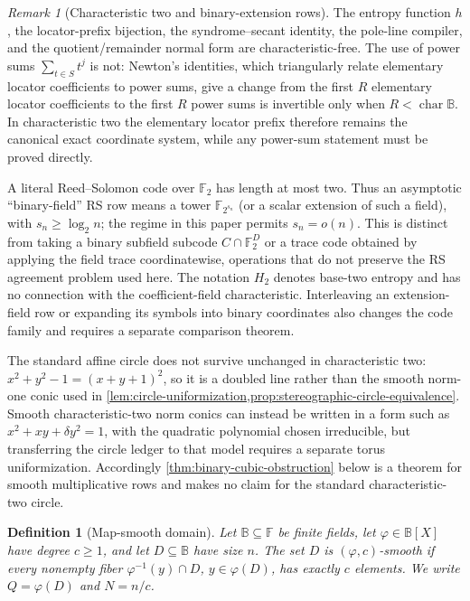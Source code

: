 \documentclass[12pt,a4paper]{amsart}
\numberwithin{equation}{section}
\newtheorem{definition}[definition]{Definition}
\theoremstyle{remark}
\newtheorem{remark}[remark]{Remark}
\newcommand{\F}{\mathbb F}
\newcommand{\B}{\mathbb B}
\begin{document}
\begin{remark}[Characteristic two and binary-extension rows]
\label{rem:characteristic-two-rows}
The entropy function \(h\), the locator-prefix bijection, the
syndrome--secant identity, the pole-line compiler, and the
quotient/remainder normal form are characteristic-free.  The use of
power sums \(\sum_{t\in S}t^j\) is not: Newton's identities, which triangularly relate elementary
locator coefficients to power sums, give a change from the first \(R\)
elementary locator coefficients to the first \(R\) power sums is
invertible only when \(R<\operatorname{char}\B\).  In characteristic two
the elementary locator prefix therefore remains the canonical exact
coordinate system, while any power-sum statement must be proved directly.

A literal Reed--Solomon code over \(\F_2\) has length at most two.  Thus an
asymptotic ``binary-field'' RS row means a tower
\(\F_{2^{s_n}}\) (or a scalar extension of such a field), with
\(s_n\ge\log_2 n\); the regime in this paper permits
\(s_n=o(n)\).  This is distinct from taking a binary subfield subcode
\(C\cap\F_2^D\) or a trace code obtained by applying the field trace
coordinatewise, operations that do not preserve the RS agreement problem
used here.  The notation \(H_2\) denotes base-two entropy and has no
connection with the coefficient-field characteristic.  Interleaving an
extension-field row or expanding its symbols into binary coordinates also
changes the code family and requires a separate comparison theorem.

The standard affine circle does not survive unchanged in characteristic
two: \(x^2+y^2-1=(x+y+1)^2\), so it is a doubled line rather than the
smooth norm-one conic used in
\cref{lem:circle-uniformization,prop:stereographic-circle-equivalence}.
Smooth characteristic-two norm
conics can instead be written in a form such as
\(x^2+xy+\delta y^2=1\), with the quadratic polynomial chosen
irreducible, but transferring the circle ledger to that model requires a
separate torus uniformization.  Accordingly
\cref{thm:binary-cubic-obstruction} below is a theorem for smooth
multiplicative rows and makes no claim for the standard characteristic-two
circle.
\end{remark}

\begin{definition}[Map-smooth domain]\label{def:map-smooth}
Let \(\B\subseteq\F\) be finite fields, let \(\varphi\in\B[X]\) have
degree \(c\ge1\), and let \(D\subseteq\B\) have size \(n\).  The set
\(D\) is \((\varphi,c)\)-smooth if every nonempty fiber
\(\varphi^{-1}(y)\cap D\), \(y\in\varphi(D)\), has exactly \(c\)
elements.  We write \(Q=\varphi(D)\) and \(N=n/c\).
\end{definition}
\end{document}
